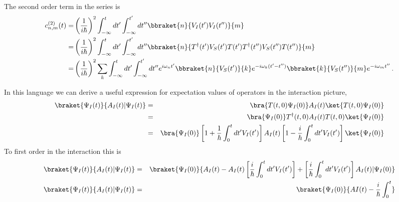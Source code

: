 The second order term in the series is
\begin{align}
  c^{(2)}_{n,m}(t)
  =& \left(\frac{1}{i\hbar}\right)^2 \int_{-\infty}^t dt' \int_{-\infty}^{t'} dt'' \bbraket{n}{V_I(t')V_I(t'')}{m} \nonumber \\
  =& \left(\frac{1}{i\hbar}\right)^2 \int_{-\infty}^t dt' \int_{-\infty}^{t'} dt'' \bbraket{n}{T^{\dagger}(t')V_S(t')T(t')T^{\dagger}(t'')V_S(t'')T(t'')}{m} \nonumber \\
  =& \left(\frac{1}{i\hbar}\right)^2 \sum_{k} \int_{-\infty}^t dt' \int_{-\infty}^{t'} dt'' e^{i\omega_n t'} \bbraket{n}{V_S(t')}{k} e^{-i \omega_k (t'-t'')} \bbraket{k}{V_S(t'')}{m} e^{-i\omega_m t''}
  \, .
\end{align}

In this language we can derive a useful expression for expectation
values of operators in the interaction picture, \begin{eqnarray*}
\braket{\Psi_{I}(t)}{A_{I}(t)|\Psi_{I}(t)} & = & \bra{T(t,0)\Psi_{I}(0)}A_{I}(t)\ket{T(t,0)\Psi_{I}(0)}\\
& = & \bra{\Psi_{I}(0)}T^{\dagger}(t,0)A_{I}(t)T(t,0)\ket{\Psi_{I}(0)}\\
& = & \bra{\Psi_{I}(0)}\left[1+\frac{1}{\hbar}\int_{0}^{t}dt'V_{I}(t')\right]A_{I}(t)\left[1-\frac{i}{\hbar}\int_{0}^{t}dt'V_{I}(t')\right]\ket{\Psi_{I}(0)}\end{eqnarray*}
To first order in the interaction this is \begin{eqnarray*}
\braket{\Psi_{I}(t)}{A_{I}(t)|\Psi_{I}(t)} & = & \braket{\Psi_{I}(0)}{A_{I}(t)-A_{I}(t)\left[\frac{i}{\hbar}\int_{0}^{t}dt'V_{I}(t')\right]+\left[\frac{i}{\hbar}\int_{0}^{t}dt'V_{I}(t')\right]A_{I}(t)|\Psi_{I}(0)}\\
\braket{\Psi_{I}(t)}{A_{I}(t)|\Psi_{I}(t)} & = & \braket{\Psi_{I}(0)}{AI(t)-\frac{i}{\hbar}\int_{0}^{t}}\end{eqnarray*}
